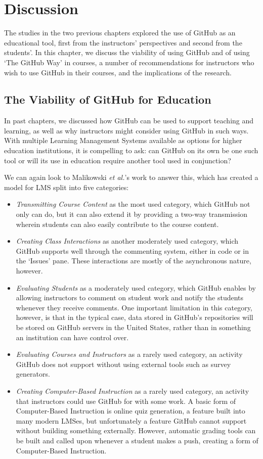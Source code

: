 \chapter{Discussion}
The studies in the two previous chapters explored the use of GitHub as an educational tool, first from the instructors' perspectives and second from the students'. In this chapter, we discuss the viability of using GitHub and of using `The GitHub Way' in courses, a number of recommendations for instructors who wish to use GitHub in their courses, and the implications of the research.

\section{The Viability of GitHub for Education}
In past chapters, we discussed how GitHub can be used to support teaching and learning, as well as why instructors might consider using GitHub in such ways. With multiple Learning Management Systems available as options for higher education institutions, it is compelling to ask: can GitHub on its own be one such tool or will its use in education require another tool used in conjunction?

We can again look to Malikowski \textit{et al.}'s \cite{malikowski2007model} work to answer this, which has created a model for LMS split into five categories: \\
\begin{itemize}
\item \emph{Transmitting Course Content} as the most used category, which GitHub not only can do, but it can also extend it by providing a two-way transmission wherein students can also easily contribute to the course content.
\item \emph{Creating Class Interactions} as another moderately used category, which GitHub supports well through the commenting system, either in code or in the `Issues' pane. These interactions are mostly of the asynchronous nature, however.
\item \emph{Evaluating Students} as a moderately used category, which GitHub enables by allowing instructors to comment on student work and notify the students whenever they receive comments. One important limitation in this category, however, is that in the typical case, data stored in GitHub's repositories will be stored on GitHub servers in the United States, rather than in something an institution can have control over.
\item \emph{Evaluating Courses and Instructors} as a rarely used category, an activity GitHub does not support without using external tools such as survey generators.
\item \emph{Creating Computer-Based Instruction} as a rarely used category, an activity that instructors could use GitHub for with some work. A basic form of Computer-Based Instruction is online quiz generation, a feature built into many modern LMSes, but unfortunately a feature GitHub cannot support without building something externally. However, automatic grading tools can be built and called upon whenever a student makes a push, creating a form of Computer-Based Instruction.
\end{itemize}

